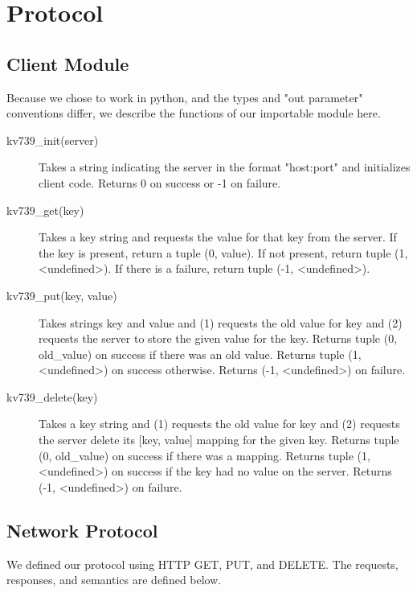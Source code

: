 \section*{Protocol}
\subsection*{Client Module}
Because we chose to work in python, and the types and "out parameter"
conventions differ, we describe the functions of our importable module here. %

\begin{description}
  \item[kv739\_init(server)] Takes a string indicating the server in the format
                             "host:port" and initializes client code. Returns 0
                             on success or -1 on failure.
  \item[kv739\_get(key)] Takes a key string and requests the value for that key
                         from the server. If the key is present, return a tuple
                         (0, value). If not present, return tuple (1,
                         <undefined>). If there is a failure, return tuple (-1,
                         <undefined>).
  \item[kv739\_put(key, value)] Takes strings key and value and (1) requests the
                                old value for key and (2) requests the server to
                                store the given value for the key. Returns tuple
                                (0, old\_value) on success if there was an old
                                value. Returns tuple (1, <undefined>) on success
                                otherwise. Returns (-1, <undefined>) on failure.
  \item[kv739\_delete(key)] Takes a key string and (1) requests the old value
                            for key and (2) requests the server delete its
                            [key, value] mapping for the given key. Returns tuple
                            (0, old\_value) on success if there was a mapping.
                            Returns tuple (1, <undefined>) on success if the key
                            had no value on the server. Returns (-1, <undefined>)
                            on failure.
\end{description}

\subsection*{Network Protocol}
We defined our protocol using HTTP GET, PUT, and DELETE. The requests,
responses, and semantics are defined below.


